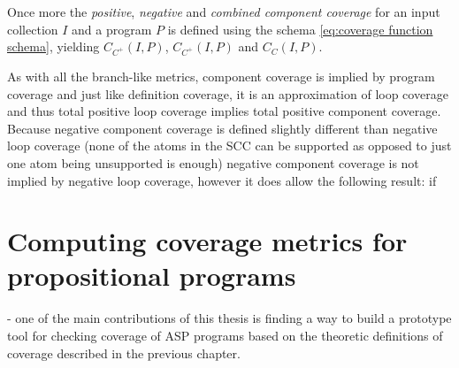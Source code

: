 Once more the \emph{positive}, \emph{negative} and \emph{combined component coverage} for an input collection $I$ and a program $P$ is defined using the schema \ref{eq:coverage function schema}, yielding \(C_{C^+}(I, P)\), \(C_{C^+}(I, P)\) and \(C_{C}(I, P)\).

As with all the branch-like metrics, component coverage is implied by program coverage and just like definition coverage, it is an approximation of loop coverage and thus total positive loop coverage implies total positive component coverage.
Because negative component coverage is defined slightly different than negative loop coverage (none of the atoms in the SCC can be supported as opposed to just one atom being unsupported is enough) negative component coverage is not implied by negative loop coverage, however it does allow the following result: if 

\begin{example}
    
\end{example}

\chapter{Computing coverage metrics for propositional programs}
\label{ch:Computing coverage metrics for propositional programs}
- one of the main contributions of this thesis is finding a way to build a prototype tool for checking coverage of ASP programs 
based on the theoretic definitions of coverage described in the previous chapter.

